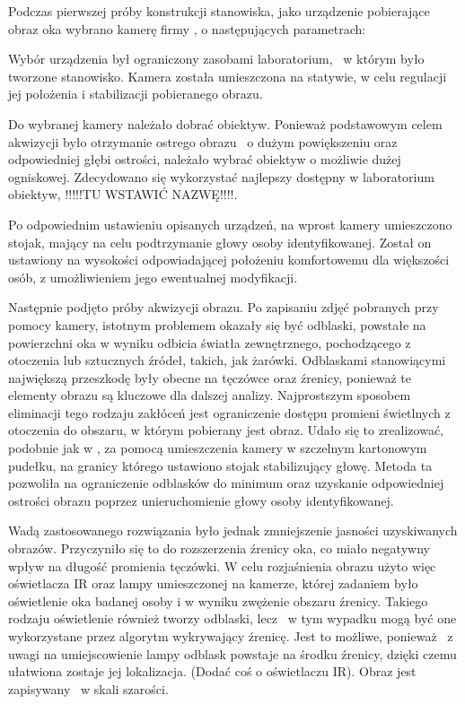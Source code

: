 Podczas pierwszej próby konstrukcji stanowiska, jako urządzenie pobierające obraz oka wybrano kamerę firmy , o następujących parametrach:

Wybór urządzenia był ograniczony zasobami laboratorium, ~w którym było tworzone stanowisko. Kamera została umieszczona na statywie, w celu regulacji jej położenia i stabilizacji pobieranego obrazu.

Do wybranej kamery należało dobrać obiektyw. Ponieważ podstawowym celem akwizycji było otrzymanie ostrego obrazu ~o dużym powiększeniu oraz odpowiedniej głębi ostrości, należało wybrać obiektyw o możliwie dużej ogniskowej. Zdecydowano się wykorzystać najlepszy dostępny w laboratorium obiektyw, !!!!!TU WSTAWIĆ NAZWĘ!!!!.

Po odpowiednim ustawieniu opisanych urządzeń, na wprost kamery umieszczono stojak, mający na celu podtrzymanie głowy osoby identyfikowanej. Został on ustawiony na wysokości odpowiadającej położeniu komfortowemu dla większości osób, z umożliwieniem jego ewentualnej modyfikacji.

Następnie podjęto próby akwizycji obrazu. Po zapisaniu zdjęć pobranych przy pomocy kamery, istotnym problemem okazały się być odblaski, powstałe na powierzchni oka w wyniku odbicia światła zewnętrznego, pochodzącego z otoczenia lub sztucznych źródeł, takich, jak żarówki. Odblaskami stanowiącymi największą przeszkodę były obecne na tęczówce oraz źrenicy, ponieważ te elementy obrazu są kluczowe dla dalszej analizy. Najprostszym sposobem eliminacji tego rodzaju zakłóceń jest ograniczenie dostępu promieni świetlnych z otoczenia do obszaru, w którym pobierany jest obraz. Udało się to zrealizować, podobnie jak w \cite{Gl11}, za pomocą umieszczenia kamery w szczelnym kartonowym pudełku, na granicy którego ustawiono stojak stabilizujący głowę. Metoda ta pozwoliła na ograniczenie odblasków do minimum oraz uzyskanie odpowiedniej ostrości obrazu poprzez unieruchomienie głowy osoby identyfikowanej.

Wadą zastosowanego rozwiązania było jednak zmniejszenie jasności uzyskiwanych obrazów. Przyczyniło się to do rozszerzenia źrenicy oka, co miało negatywny wpływ na długość promienia tęczówki. W celu rozjaśnienia obrazu użyto więc oświetlacza IR oraz lampy umieszczonej na kamerze, której zadaniem było oświetlenie oka badanej osoby i w wyniku zwężenie obszaru źrenicy. Takiego rodzaju oświetlenie również tworzy odblaski, lecz ~w tym wypadku mogą być one wykorzystane przez algorytm wykrywający źrenicę. Jest to możliwe, ponieważ ~z uwagi na umiejscowienie lampy odblask powstaje na środku źrenicy, dzięki czemu ułatwiona zostaje jej lokalizacja. (Dodać coś o oświetlaczu IR). Obraz jest zapisywany ~w skali szarości.

